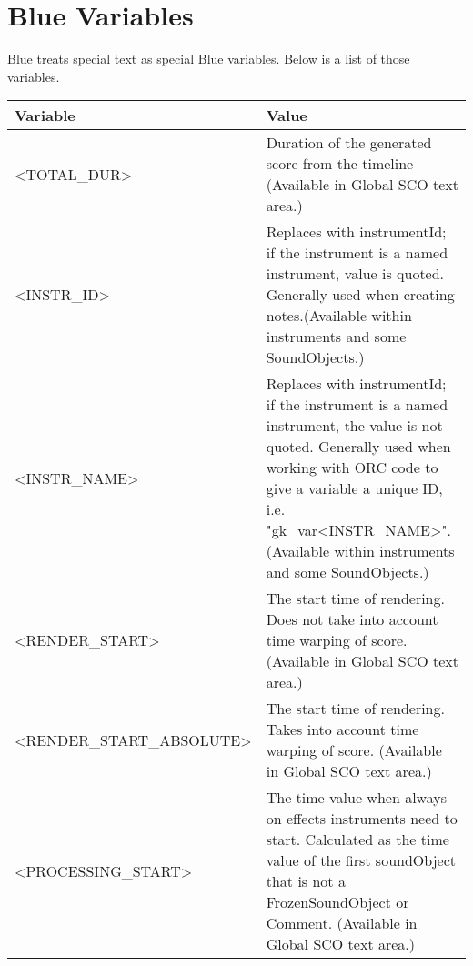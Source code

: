 \section{Blue Variables}\label{blueVariables}

Blue treats special text as special Blue variables. Below is a list of
those variables.

\begin{longtable}[]{@{}ll@{}}
\toprule
Variable & Value\tabularnewline
\midrule
\endhead
\textless{}TOTAL\_DUR\textgreater{} & Duration of the generated score
from the timeline (Available in Global SCO text area.)\tabularnewline
\textless{}INSTR\_ID\textgreater{} & Replaces with instrumentId; if the
instrument is a named instrument, value is quoted. Generally used when
creating notes.(Available within instruments and some
SoundObjects.)\tabularnewline
\textless{}INSTR\_NAME\textgreater{} & Replaces with instrumentId; if
the instrument is a named instrument, the value is not quoted. Generally
used when working with ORC code to give a variable a unique ID, i.e.
"gk\_var\textless{}INSTR\_NAME\textgreater{}".(Available within
instruments and some SoundObjects.)\tabularnewline
\textless{}RENDER\_START\textgreater{} & The start time of rendering.
Does not take into account time warping of score. (Available in Global
SCO text area.)\tabularnewline
\textless{}RENDER\_START\_ABSOLUTE\textgreater{} & The start time of
rendering. Takes into account time warping of score. (Available in
Global SCO text area.)\tabularnewline
\textless{}PROCESSING\_START\textgreater{} & The time value when
always-on effects instruments need to start. Calculated as the time
value of the first soundObject that is not a FrozenSoundObject or
Comment. (Available in Global SCO text area.)\tabularnewline
\bottomrule
\end{longtable}
